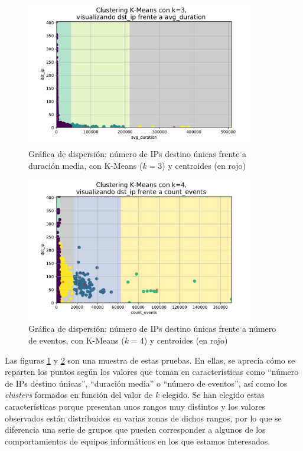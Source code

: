 \begin{figure}[h]
    \centering
    \captionsetup{width=0.75\textwidth}
    \includegraphics[width=0.9\textwidth]{contenido/fig/dispersion-k3-dst_ip-vs-avg_duration.pdf}
    \caption{Gráfica de dispersión: número de IPs destino únicas frente a duración media, con K-Means ($k=3$) y centroides (en rojo)}
    \label{fig:scatterdstipavgduration}
\end{figure}

\begin{figure}[h]
    \centering
    \captionsetup{width=0.75\textwidth}
    \includegraphics[width=0.9\textwidth]{contenido/fig/dispersion-k4-dst_ip-vs-count_events.pdf}
    \caption{Gráfica de dispersión: número de IPs destino únicas frente a número de eventos, con K-Means ($k=4$) y centroides (en rojo)}
    \label{fig:scatterdstipcountevents}
\end{figure}

Las figuras \ref{fig:scatterdstipavgduration} y \ref{fig:scatterdstipcountevents} son una muestra de estas pruebas.
En ellas, se aprecia cómo se reparten los puntos según los valores que toman en características como ``número de IPs destino únicas'', ``duración media'' o ``número de eventos'',
así como los \emph{clusters} formados en función del valor de $k$ elegido.
Se han elegido estas características porque presentan unos rangos muy distintos y los valores observados están distribuidos en varias zonas de dichos rangos,
por lo que se diferencia una serie de grupos que pueden corresponder a algunos de los comportamientos de equipos informáticos en los que estamos interesados.


